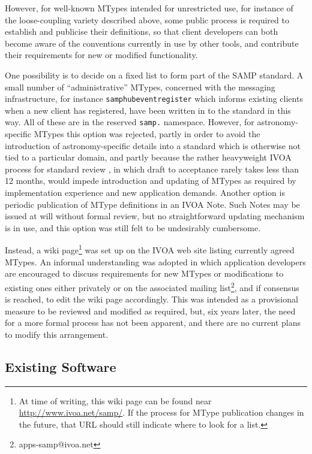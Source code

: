 \documentclass[5p]{elsarticle}
\begin{document}
However, for well-known MTypes intended for unrestricted use,
for instance of the loose-coupling variety described above,
some public process is required to establish
and publicise their definitions, so that client developers can
both become aware of the conventions currently in use by other tools,
and contribute their requirements for new or modified functionality.

One possibility
is to decide on a fixed list to form part of the SAMP standard.
A small number of ``administrative'' MTypes,
concerned with the messaging infrastructure,
for instance {\tt samp{\kdot}hub{\kdot}event{\kdot}register}
which informs existing clients when a new client has registered,
have been written in to the standard in this way.
All of these are in the reserved {\tt samp.} namespace.
However, for astronomy-specific MTypes this option was rejected,
partly in order to avoid the introduction of astronomy-specific details
into a standard which is otherwise not tied to a particular domain,
and partly because the rather heavyweight IVOA process for
standard review \citep{ivoadoc},
in which draft to acceptance rarely takes less than 12 months,
would impede introduction and updating of MTypes as required
by implementation experience and new application demands.
Another option is periodic publication of MType definitions
in an IVOA Note.  Such Notes may be issued at will without formal review,
but no straightforward updating mechanism is in use,
and this option was still felt to be undesirably cumbersome.

Instead, a wiki page\footnote{
  At time of writing, this wiki page can be found near
  \mbox{\url{http://www.ivoa.net/samp/}}.
  If the process for MType publication changes in the future,
  that URL should still indicate where to look for a list.}
was set up on the IVOA web site listing currently agreed MTypes.
An informal understanding was adopted in which
application developers are encouraged to discuss requirements for
new MTypes or modifications to existing ones either privately or
on the associated mailing list\footnote{apps-samp@ivoa.net}, 
and if consensus is reached, to edit the wiki page accordingly.
This was intended as a provisional measure to be reviewed and
modified as required, but, six years later, the need for a more
formal process has not been apparent, and there are no current
plans to modify this arrangement.

\subsection{Existing Software} \label{sec:software}
\end{document}
